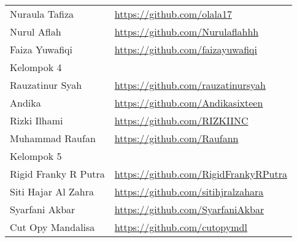 \documentclass[a4paper]{tufte-handout}
\begin{document}
\begin{projects}
\begin{description}
\begin{table}[!ht]
\begin{tabular}{ll}
Nuraula Tafiza			& \url{https://github.com/olala17} \\
Nurul Aflah				& \url{https://github.com/Nurulaflahhh} \\
Faiza Yuwafiqi			& \url{https://github.com/faizayuwafiqi} \\
\midrule
Kelompok 4\\
\midrule
Rauzatinur Syah			& \url{https://github.com/rauzatinursyah} \\
Andika				& \url{https://github.com/Andikasixteen} \\
Rizki Ilhami			& \url{https://github.com/RIZKIINC} \\
Muhammad Raufan			& \url{https://github.com/Raufann} \\
\midrule
Kelompok 5\\
\midrule
Rigid Franky R Putra	& \url{https://github.com/RigidFrankyRPutra} \\
Siti Hajar Al Zahra		& \url{https://github.com/sitihjralzahara} \\
Syarfani Akbar			& \url{https://github.com/SyarfaniAkbar} \\
Cut Opy Mandalisa		& \url{https://github.com/cutopymdl} \\
\midrule
\end{tabular}
\end{table}
\end{description}
\end{projects}
\end{document}

